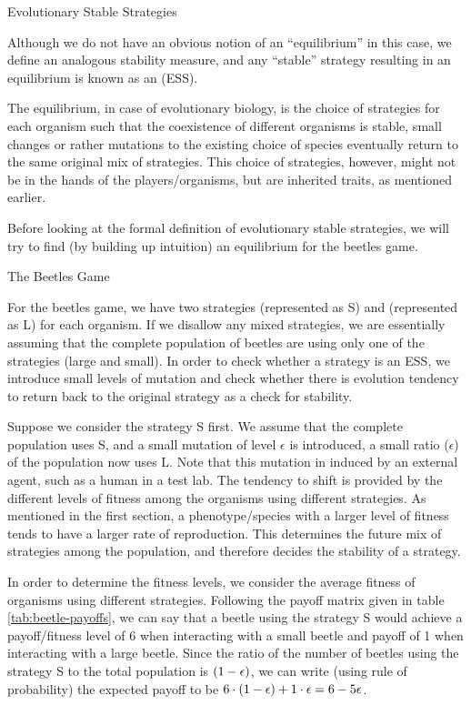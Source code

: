 \documentclass{article}
\begin{document}
\begin{ssection}{Evolutionary Stable Strategies}

	Although we do not have an obvious notion of an ``equilibrium'' in this case, we define an analogous stability measure, and any ``stable'' strategy resulting in an equilibrium is known as an  (ESS).

	The equilibrium, in case of evolutionary biology, is the choice of strategies for each organism such that the coexistence of different organisms is stable, \ie small changes or rather mutations to the existing choice of species eventually return to the same original mix of strategies. This choice of strategies, however, might not be in the hands of the players/organisms, but are inherited traits, as mentioned earlier.

	Before looking at the formal definition of evolutionary stable strategies, we will try to find (by building up intuition) an equilibrium for the beetles game.

	\begin{sssubsection}{The Beetles Game}

		For the beetles game, we have two strategies  (represented as S) and  (represented as L) for each organism. If we disallow any mixed strategies, we are essentially assuming that the complete population of beetles are using only one of the strategies (large and small). In order to check whether a strategy is an ESS, we introduce small levels of mutation and check whether there is evolution tendency to return back to the original strategy as a check for stability.

		Suppose we consider the strategy S first. We assume that the complete population uses S, and a small mutation of level $\epsilon$ is introduced, \ie a small ratio ($\epsilon$) of the population now uses L. Note that this mutation in induced by an external agent, such as a human in a test lab. The tendency to shift is provided by the different levels of fitness among the organisms using different strategies. As mentioned in the first section, a phenotype/species with a larger level of fitness tends to have a larger rate of reproduction. This determines the future mix of strategies among the population, and therefore decides the stability of a strategy.

		In order to determine the fitness levels, we consider the average fitness of organisms using different strategies. Following the payoff matrix given in table \ref{tab:beetle-payoffs}, we can say that a beetle using the strategy S would achieve a payoff/fitness level of 6 when interacting with a small beetle and payoff of 1 when interacting with a large beetle. Since the ratio of the number of beetles using the strategy S to the total population is $(1 - \epsilon)$, we can write (using rule of probability) the expected payoff to be $6 \cdot (1 - \epsilon) + 1 \cdot \epsilon = 6 - 5\epsilon$.


\end{sssubsection}
\end{ssection}
\end{document}
